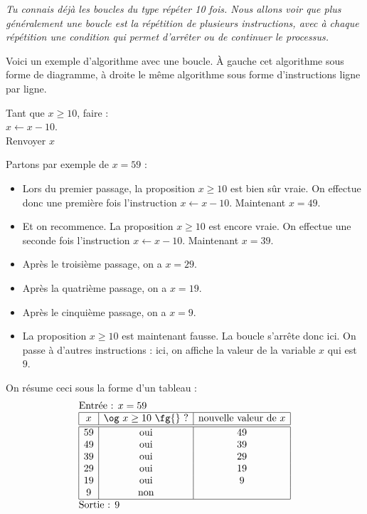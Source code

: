 \documentclass[class=report,crop=false, 12pt]{standalone}
\begin{document}

\emph{Tu connais déjà les boucles du type \emph{répéter 10 fois}. 
Nous allons voir que plus généralement une \emph{boucle} est la répétition de plusieurs instructions, 
avec à chaque répétition une condition qui permet d'arrêter ou de continuer le processus.}

\bigskip
\bigskip

Voici un exemple d'algorithme avec une boucle. À gauche cet algorithme sous forme de diagramme, à droite le même algorithme sous forme d'instructions ligne par ligne.

\begin{center}
\begin{minipage}{0.7\textwidth} 
\end{minipage}
\begin{minipage}{0.29\textwidth}
Tant que $x \ge 10$, faire :\\
\indentation $x \leftarrow x-10$.\\
Renvoyer $x$
\end{minipage}
\end{center}


Partons par exemple de $x=59$ :
\begin{itemize}
  \item Lors du premier passage, la proposition \og $x\ge10$ \fg{} est bien sûr vraie. On effectue donc une première fois l'instruction $x \leftarrow x-10$. Maintenant $x=49$. 
  \item Et on recommence. La proposition \og $x\ge10$ \fg{} est encore vraie. On effectue une seconde fois l'instruction 
 $x \leftarrow x-10$. Maintenant $x=39$.  
  \item Après le troisième passage, on a $x=29$.
  \item Après la quatrième passage, on a $x=19$.
  \item Après le cinquième passage, on a $x = 9$.
  \item La proposition \og $x \ge 10$ \fg{} est maintenant fausse. La boucle s'arrête donc ici. On passe à d'autres instructions : ici, on affiche la valeur de la variable $x$ qui est $9$.
\end{itemize}

On résume ceci sous la forme d'un tableau :
  $$
  \begin{array}{l}
  \text{Entrée : $x=59$}    \\
  \begin{array}{|c|c|c|}
  \hline  
   x & \text{\og $x\ge10$ \fg{} ?} & \text{nouvelle valeur de } x \\
  \hline\hline 
  59 & \text{oui} & 49 \\
  49 & \text{oui} & 39 \\
  39 & \text{oui} & 29 \\
  29 & \text{oui} & 19 \\
  19 & \text{oui} & 9 \\
  9 & \text{non} &  \\ 
  \hline
  \end{array} \\
  \text{Sortie : $9$}  
  \end{array} 
  $$ 
\end{document}
